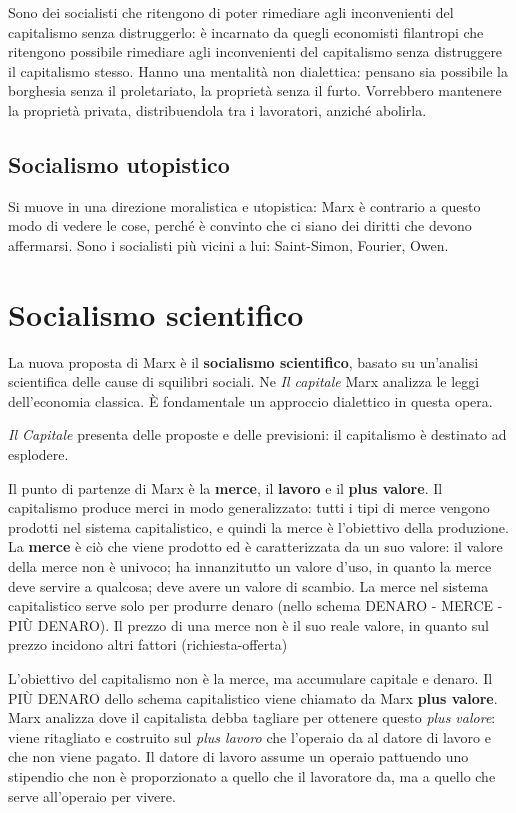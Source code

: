 \documentclass[a4paper, twoside, titlepage]{book}
\begin{document}
Sono dei socialisti che ritengono di poter rimediare agli inconvenienti del capitalismo senza distruggerlo: è incarnato da quegli economisti filantropi che ritengono possibile  rimediare agli inconvenienti del capitalismo senza distruggere il capitalismo stesso. Hanno una mentalità non dialettica: pensano sia possibile la borghesia senza il proletariato, la proprietà senza il furto. Vorrebbero mantenere la proprietà privata, distribuendola tra i lavoratori, anziché abolirla.

\section{Socialismo utopistico}

Si muove in una direzione moralistica e utopistica: Marx è contrario a questo modo di vedere le cose, perché è convinto che ci siano dei diritti che devono affermarsi.
Sono i socialisti più vicini a lui: Saint-Simon, Fourier, Owen.

\chapter{Socialismo scientifico}

La nuova proposta di Marx è il \textbf{socialismo scientifico}, basato su un’analisi scientifica delle cause di squilibri sociali.
Ne \textit{Il capitale} Marx analizza le leggi dell’economia classica.
È fondamentale un approccio dialettico in questa opera.

\textit{Il Capitale} presenta delle proposte e delle previsioni: il capitalismo è destinato ad esplodere.

Il punto di partenze di Marx è la \textbf{merce}, il \textbf{lavoro} e il \textbf{plus valore}.
Il capitalismo produce merci in modo generalizzato: tutti i tipi di merce vengono prodotti nel sistema capitalistico, e quindi la merce è l’obiettivo della produzione.
La \textbf{merce} è ciò che viene prodotto ed è caratterizzata da un suo valore: il valore della merce non è univoco; ha innanzitutto un valore d’uso, in quanto la merce deve servire a qualcosa; deve avere un valore di scambio.
La merce nel sistema capitalistico serve solo per produrre denaro (nello schema DENARO - MERCE - PIÙ DENARO).
Il prezzo di una merce non è il suo reale valore, in quanto sul prezzo incidono altri fattori (richiesta-offerta)

L’obiettivo del capitalismo non è la merce, ma accumulare capitale e denaro. Il PIÙ DENARO dello schema capitalistico viene chiamato da Marx \textbf{plus valore}. Marx analizza dove il capitalista debba tagliare per ottenere questo \textit{plus valore}: viene ritagliato e costruito sul \textit{plus lavoro} che l’operaio da al datore di lavoro e che non viene pagato.
Il datore di lavoro assume un operaio pattuendo uno stipendio che non è proporzionato a quello che il lavoratore da, ma a quello che serve all’operaio per vivere.
\end{document}
